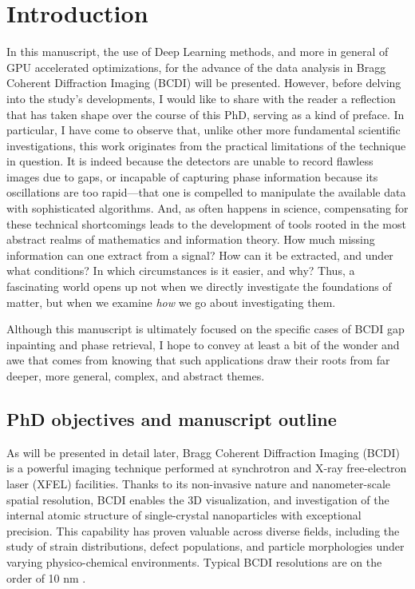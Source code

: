 \section{Introduction}\label{chp:intro}

In this manuscript, the use of Deep Learning methods, and more in general of GPU accelerated optimizations, for the advance of 
the data analysis in Bragg Coherent Diffraction Imaging (BCDI) will be presented. However, before delving into the 
study’s developments, I would like to share with the reader a reflection that has taken shape over the course of this 
PhD, serving as a kind of preface. In particular, I have come to observe that, unlike other more fundamental 
scientific investigations, this work originates from the practical limitations of the technique in question. 
It is indeed because the detectors are unable to record flawless images due to gaps, or incapable of 
capturing phase information because its oscillations are too rapid—that one is compelled to manipulate the available 
data with sophisticated algorithms. And, as often happens in science, compensating for these technical shortcomings 
leads to the development of tools rooted in the most abstract realms of mathematics and information theory. How much 
missing information can one extract from a signal? How can it be extracted, and under what conditions? In which 
circumstances is it easier, and why? Thus, a fascinating world opens up not when we directly investigate the foundations 
of matter, but when we examine \textit{how} we go about investigating them. 

Although this manuscript is ultimately focused on the specific cases of BCDI gap inpainting and phase retrieval, 
I hope to convey at least a bit of the wonder and awe that comes from knowing that such applications draw their roots 
from far deeper, more general, complex, and abstract themes.

\subsection{PhD objectives and manuscript outline}

As will be presented in detail later, Bragg Coherent Diffraction Imaging (BCDI) is a powerful imaging technique performed 
at synchrotron and X-ray free-electron laser (XFEL) facilities. Thanks to its non-invasive nature and nanometer-scale 
spatial resolution, BCDI enables the 3D visualization, and investigation of the internal atomic structure of single-crystal nanoparticles 
with exceptional precision. This capability has proven valuable across diverse fields, including the study of strain 
distributions, defect populations, and particle morphologies under varying physico-chemical environments. Typical BCDI 
resolutions are on the order of 10 nm \cite{BCDI_review2024}.

